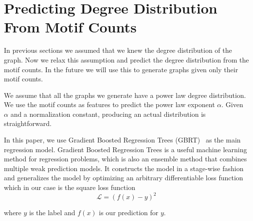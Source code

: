 \section{Predicting Degree Distribution From Motif Counts}
\label{sec:alpha}


In previous sections we assumed that we knew the degree distribution of the graph.  Now we relax this assumption and predict the degree distribution from the motif counts.  In the future we will use this to generate graphs given only their motif counts.

We assume that all the graphs we generate have a power law degree distribution.  We use the motif counts as features to predict the power law exponent $\alpha$.  Given $\alpha$ and a normalization constant, producing an actual distribution is straightforward.

In this paper, we use Gradient Boosted Regression Trees (GBRT)~\cite{friedman2002stochastic} as the main regression model. Gradient Boosted Regression Trees is a useful machine learning method for regression problems, which is also an ensemble method that combines multiple weak prediction models. It constructs the model in a stage-wise fashion and generalizes the model by optimizing an arbitrary differentiable loss function which in our case is the square loss function
\begin{equation}
\label{eqn:loss}
\mathcal{L} = (f(x) - y)^2
\end{equation}

\noindent where $y$ is the label and $f(x)$ is our prediction for $y$.

